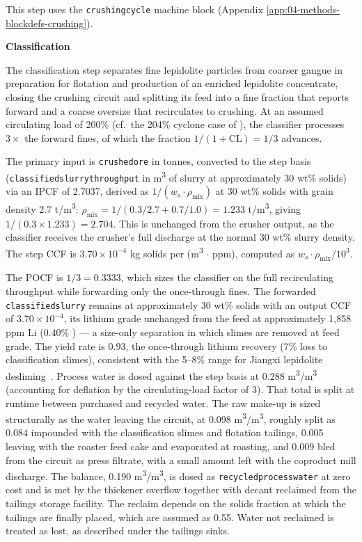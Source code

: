 \documentclass{article}
\renewcommand\_{\textunderscore\allowbreak}
\begin{document}
This step uses the \texttt{crushing\_cycle} machine block (Appendix \ref{app:04-methods-blockdefs-crushing}).

\medskip
\noindent\textbf{Classification}\quad

The classification step separates fine lepidolite particles from coarser gangue in preparation for flotation and production of an enriched lepidolite concentrate, closing the crushing circuit and splitting its feed into a fine fraction that reports forward and a coarse oversize that recirculates to crushing. At an assumed circulating load of 200\% (cf.\ the 204\% cyclone case of \citet{rejaImprovingClosedCircuit2022}), the classifier processes $3\times$ the forward fines, of which the fraction $1/(1+\mathrm{CL}) = 1/3$ advances.

The primary input is \texttt{crushed\_ore} in tonnes, converted to the step basis (\texttt{classified\_slurry\_throughput} in \si{m^3} of slurry at approximately 30 wt\% solids) via an IPCF of 2.7037, derived as $1/(w_s \cdot \rho_{\text{mix}})$ at 30 wt\% solids with grain density 2.7 \si{t/m^3}: $\rho_{\text{mix}} = 1/(0.3/2.7 + 0.7/1.0) = 1.233$ \si{t/m^3}, giving $1/(0.3 \times 1.233) = 2.704$. This is unchanged from the crusher output, as the classifier receives the crusher's full discharge at the normal 30 wt\% slurry density. The step CCF is $3.70 \times 10^{-4}$ kg solids per (\si{m^3} $\cdot$ ppm), computed as $w_s \cdot \rho_{\text{mix}}/10^3$.

The POCF is $1/3 = 0.3333$, which sizes the classifier on the full recirculating throughput while forwarding only the once-through fines. The forwarded \texttt{classified\_slurry} remains at approximately 30 wt\% solids with an output CCF of $3.70 \times 10^{-4}$, its lithium grade unchanged from the feed at approximately 1,858 ppm Li (0.40\% ) --- a size-only separation in which slimes are removed at feed grade. The yield rate is 0.93, the once-through lithium recovery (7\% loss to classification slimes), consistent with the 5--8\% range for Jiangxi lepidolite desliming~\cite{zhangInnovativeRecoveryLepidolite2025}. Process water is dosed against the step basis at 0.288 \si{m^3/m^3} (accounting for deflation by the circulating-load factor of 3). That total is split at runtime between purchased and recycled water. The raw make-up is sized structurally as the water leaving the circuit, at 0.098 \si{m^3/m^3}, roughly split as 0.084 impounded with the classification slimes and flotation tailings, 0.005 leaving with the roaster feed cake and evaporated at roasting, and 0.009 bled from the circuit as press filtrate, with a small amount left with the coproduct mill discharge. The balance, 0.190 \si{m^3/m^3}, is dosed as \texttt{recycled\_process\_water} at zero cost and is met by the thickener overflow together with decant reclaimed from the tailings storage facility. The reclaim depends on the solids fraction at which the tailings are finally placed, which are assumed as 0.55. %
Water not reclaimed is treated as lost, as described under the tailings sinks.
\end{document}
